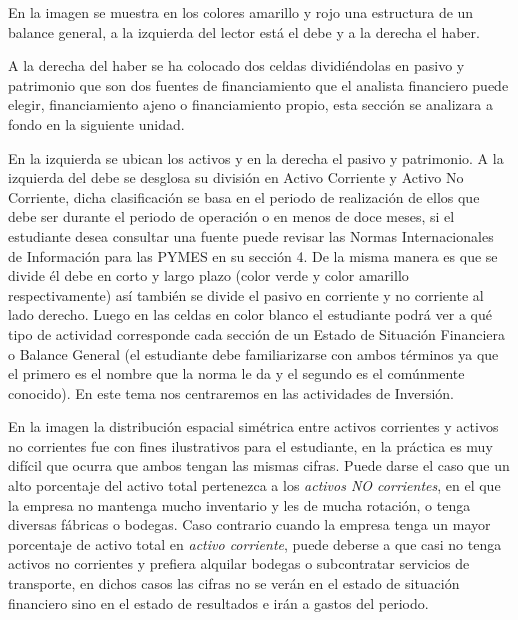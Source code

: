 \documentclass[12pt, a4paper]{article}
\begin{document}
En la imagen se muestra en los colores amarillo y rojo una estructura de un balance general, a la izquierda del lector está el debe y a la derecha el haber.

A la derecha del haber se ha colocado dos celdas dividiéndolas en pasivo y patrimonio que son dos fuentes de financiamiento que el analista financiero puede elegir, financiamiento ajeno o financiamiento propio, esta sección se analizara a fondo en la siguiente unidad.

En la izquierda se ubican los activos y en la derecha el pasivo y patrimonio. A la izquierda del debe se desglosa su división en Activo Corriente y Activo No Corriente, dicha clasificación se basa en el periodo de realización de ellos que debe ser durante el periodo de operación o en menos de doce meses, si el estudiante desea consultar una fuente puede revisar las Normas Internacionales de Información para las PYMES en su sección 4. De la misma manera es que se divide él debe en corto y largo plazo (color verde y color amarillo respectivamente) así también se divide el pasivo en corriente y no corriente al lado derecho. Luego en las celdas en color blanco el estudiante podrá ver a qué tipo de actividad corresponde cada sección de un Estado de Situación Financiera o Balance General (el estudiante debe familiarizarse con ambos términos ya que el primero es el nombre que la norma le da y el segundo es el comúnmente conocido). En este tema nos centraremos en las actividades de Inversión.

En la imagen la distribución espacial simétrica entre activos corrientes y activos no corrientes fue con fines ilustrativos para el estudiante, en la práctica es muy difícil que ocurra que ambos tengan las mismas cifras. Puede darse el caso que un alto porcentaje del activo total pertenezca a los \textit{activos NO corrientes}, en el que la empresa no mantenga mucho inventario y les de mucha rotación, o tenga diversas fábricas o bodegas. Caso contrario cuando la empresa tenga un mayor porcentaje de activo total en \textit{activo corriente}, puede deberse a que casi no tenga activos no corrientes y prefiera alquilar bodegas o subcontratar servicios de transporte, en dichos casos las cifras no se verán en el estado de situación financiero sino en el estado de resultados e irán a gastos del periodo.
\end{document}
